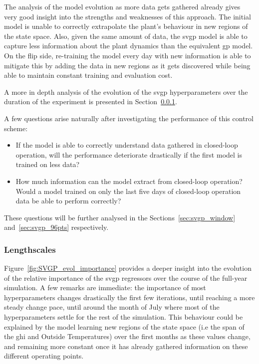 The analysis of the model evolution as more data gets gathered already gives
very good insight into the strengths and weaknesses of this approach. The
initial model is unable to correctly extrapolate the plant's behaviour in new
regions of the state space. Also, given the same amount of data, the
\acrshort{svgp} model is able to capture less information about the plant
dynamics than the equivalent \acrshort{gp} model. On the flip side, re-training
the model every day with new information is able to mitigate this by adding the
data in new regions as it gets discovered while being able to maintain constant
training and evaluation cost.

A more in depth analysis of the evolution of the \acrshort{svgp} hyperparameters
over the duration of the experiment is presented in
Section~\ref{sec:lengthscales_results}.

A few questions arise naturally after investigating the performance of this
control scheme: 

\begin{itemize}
    \item If the model is able to correctly understand data gathered in
        closed-loop operation, will the performance deteriorate drastically if
        the first model is trained on less data?
    \item How much information can the model extract from closed-loop operation?
        Would a model trained on only the last five days of closed-loop
        operation data be able to perform correctly?
\end{itemize}

These questions will be further analysed in the Sections~\ref{sec:svgp_window}
and~\ref{sec:svgp_96pts} respectively.

\clearpage

\subsubsection{Lengthscales}\label{sec:lengthscales_results}

Figure~\ref{fig:SVGP_evol_importance} provides a deeper insight into the
evolution of the relative importance of the \acrshort{svgp} regressors over the
course of the full-year simulation\footnotemark. A few remarks are immediate:
the importance of most hyperparameters changes drastically the first few
iterations, until reaching a more steady change pace, until around the month of
July where most of the hyperparameters settle for the rest of the simulation.
This behaviour could be explained by the model learning new regions of the state
space (i.e the span of the \acrshort{ghi} and Outside Temperatures) over the
first months as these values change, and remaining more constant once it has
already gathered information on these different operating points.

